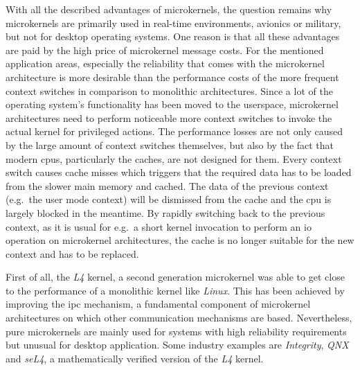 With all the described advantages of microkernels, the question remains why microkernels are primarily used in real-time environments, avionics or military, but not for desktop operating systems.
One reason is that all these advantages are paid by the high price of microkernel message costs.
For the mentioned application areas, especially the reliability that comes with the microkernel architecture is more desirable than the performance costs of the more frequent context switches in comparison to monolithic architectures\cite{tanenbaum-modern-operating-systems}.
Since a lot of the operating system's functionality has been moved to the userspace, microkernel architectures need to perform noticeable more context switches to invoke the actual kernel for privileged actions. 
The performance losses are not only caused by the large amount of context switches themselves, but also by the fact that modern \acp{cpu}, particularly the caches, are not designed for them. 
Every context switch causes cache misses which triggers that the required data has to be loaded from the slower main memory and cached. 
The data of the previous context (e.g.\ the user mode context) will be dismissed from the cache and the \ac{cpu} is largely blocked in the meantime.
By rapidly switching back to the previous context, as it is usual for e.g.\ a short kernel invocation to perform an \ac{io} operation on microkernel architectures, the cache is no longer suitable for the new context and has to be replaced\cite{lfd430}.

First of all, the \textit{L4} kernel, a second generation microkernel was able to get close to the performance of a monolithic kernel like \textit{Linux}\cite{Hrtig1997}.   
This has been achieved by improving the \acf{ipc} mechanism, a fundamental component of microkernel architectures on which other communication mechanisms are based.
Nevertheless, pure microkernels are mainly used for systems with high reliability requirements but unusual for desktop application. 
Some industry examples are \textit{Integrity}, \textit{QNX} and \textit{seL4}, a mathematically verified version of the \textit{L4} kernel\cite{tanenbaum-modern-operating-systems}. 



